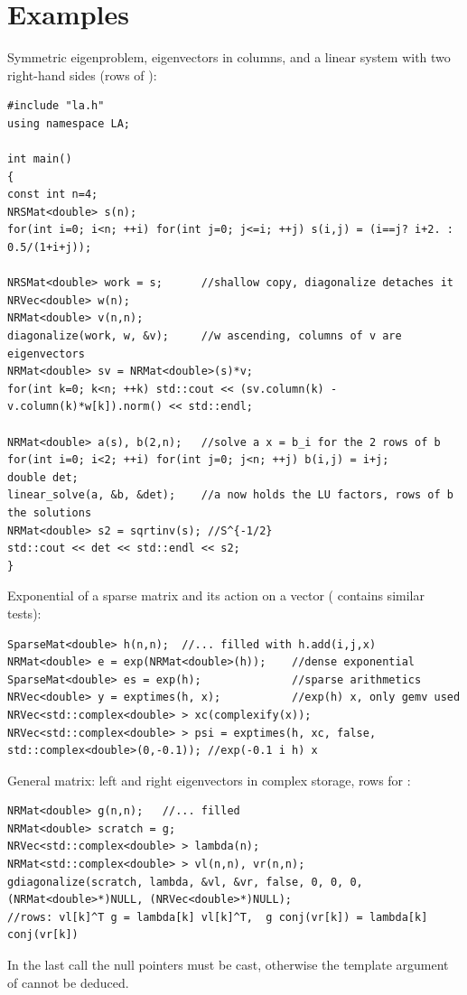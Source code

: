 \section{Examples}\label{sec:nonclass:examples}
Symmetric eigenproblem, eigenvectors in columns, and a linear system with two right-hand sides (rows of ):
\begin{lstlisting}
#include "la.h"
using namespace LA;

int main()
{
const int n=4;
NRSMat<double> s(n);
for(int i=0; i<n; ++i) for(int j=0; j<=i; ++j) s(i,j) = (i==j? i+2. : 0.5/(1+i+j));

NRSMat<double> work = s;      //shallow copy, diagonalize detaches it
NRVec<double> w(n);
NRMat<double> v(n,n);
diagonalize(work, w, &v);     //w ascending, columns of v are eigenvectors
NRMat<double> sv = NRMat<double>(s)*v;
for(int k=0; k<n; ++k) std::cout << (sv.column(k) - v.column(k)*w[k]).norm() << std::endl;

NRMat<double> a(s), b(2,n);   //solve a x = b_i for the 2 rows of b
for(int i=0; i<2; ++i) for(int j=0; j<n; ++j) b(i,j) = i+j;
double det;
linear_solve(a, &b, &det);    //a now holds the LU factors, rows of b the solutions
NRMat<double> s2 = sqrtinv(s); //S^{-1/2}
std::cout << det << std::endl << s2;
}
\end{lstlisting}
Exponential of a sparse matrix and its action on a vector ( contains similar tests):
\begin{lstlisting}
SparseMat<double> h(n,n);  //... filled with h.add(i,j,x)
NRMat<double> e = exp(NRMat<double>(h));    //dense exponential
SparseMat<double> es = exp(h);              //sparse arithmetics
NRVec<double> y = exptimes(h, x);           //exp(h) x, only gemv used
NRVec<std::complex<double> > xc(complexify(x));
NRVec<std::complex<double> > psi = exptimes(h, xc, false, std::complex<double>(0,-0.1)); //exp(-0.1 i h) x
\end{lstlisting}
General matrix: left and right eigenvectors in complex storage, rows for :
\begin{lstlisting}
NRMat<double> g(n,n);   //... filled
NRMat<double> scratch = g;
NRVec<std::complex<double> > lambda(n);
NRMat<std::complex<double> > vl(n,n), vr(n,n);
gdiagonalize(scratch, lambda, &vl, &vr, false, 0, 0, 0, (NRMat<double>*)NULL, (NRVec<double>*)NULL);
//rows: vl[k]^T g = lambda[k] vl[k]^T,  g conj(vr[k]) = lambda[k] conj(vr[k])
\end{lstlisting}
In the last call the null pointers must be cast, otherwise the template argument of  cannot be deduced.

